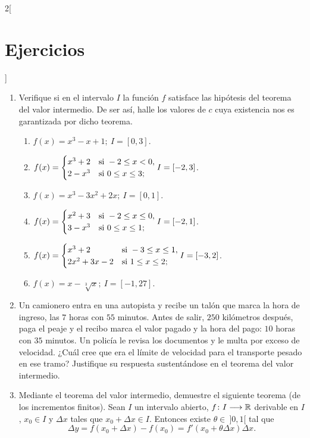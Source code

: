 \begin{multicols}{2}[\section{Ejercicios}]
\begin{enumerate}[leftmargin=*]
\item Verifique si en el intervalo $I$ la función $f$ satisface las hipótesis del teorema del
    valor intermedio. De ser así, halle los valores de $c$ cuya existencia nos es garantizada
    por dicho teorema.
    \begin{enumerate}[leftmargin=*]
    \item $\displaystyle f(x) = x^3 - x + 1;\ I = [0,3]$.
    \item $\displaystyle f(x) =
          \begin{cases}
            x^3 + 2 & \text{si } -2\leq x < 0,\\
            2 - x^3 & \text{si } 0 \leq x \leq 3;
          \end{cases}\\[6pt]
          I = [-2,3]$.
    \item $\displaystyle f(x) = x^3 - 3x^2 + 2x;\ I = [0,1]$.
    \item $\displaystyle f(x) =
          \begin{cases}
            x^2 + 3 & \text{si } -2 \leq x \leq 0, \\
            3 - x^3 & \text{si } 0 \leq x \leq 1;
          \end{cases}\\[6pt]
          I = [-2,1]$.
    \item $\displaystyle f(x) =
          \begin{cases}
            x^3 + 2 & \text{si } -3 \leq x \leq 1, \\
            2x^2 + 3x - 2 & \text{si } 1 \leq x \leq 2;
          \end{cases}\\[6pt]
          I = [-3,2]$.
    \item $\displaystyle f(x) = x - \sqrt[3]{x};\ I = [-1,27]$.
    \end{enumerate}

\item Un camionero entra en una autopista y recibe un talón que marca la hora de ingreso, las
    $7$ horas con $55$ minutos. Antes de salir, $250$ kilómetros después, paga el peaje y el
    recibo marca el valor pagado y la hora del pago: $10$ horas con $35$ minutos. Un policía le
    revisa los documentos y le multa por exceso de velocidad. ¿Cuál cree que era el límite de
    velocidad para el transporte pesado en ese tramo? Justifique su respuesta sustentándose en
    el teorema del valor intermedio.

\item Mediante el teorema del valor intermedio, demuestre el siguiente teorema (de los
    incrementos finitos). Sean $I$ un intervalo abierto, $f\colon I\longrightarrow \mathbb{R}$ derivable en
    $I$, $x_0\in I$ y $\Delta x$ tales que $x_0 + \Delta x \in I$. Entonces existe $\theta\in\
    ]0,1[$ tal que
    \[
      \Delta y = f(x_0 + \Delta x) - f(x_0) = f'(x_0 + \theta\Delta x)\Delta x.
    \]


\end{enumerate}
\end{multicols}
